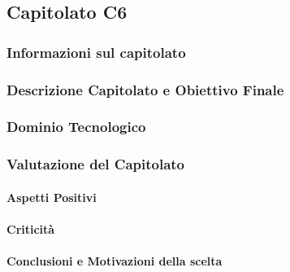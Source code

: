 \subsection{Capitolato C6}

\subsubsection{Informazioni sul capitolato}

\subsubsection{Descrizione Capitolato e Obiettivo Finale}

\subsubsection{Dominio Tecnologico}

\subsubsection{Valutazione del Capitolato}

\paragraph{Aspetti Positivi}

\paragraph{Criticità}

\paragraph{Conclusioni e Motivazioni della scelta}